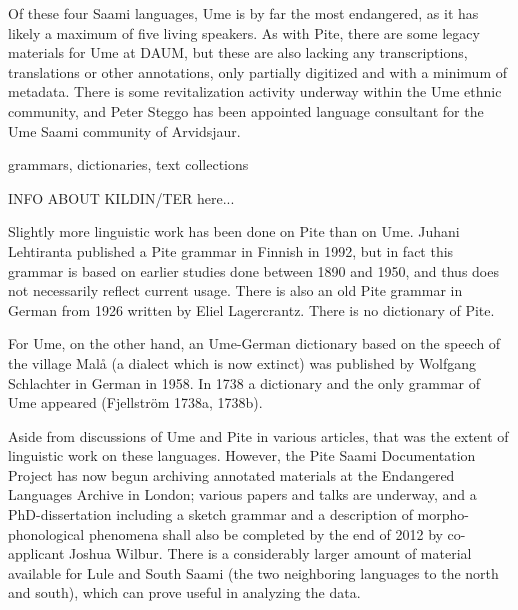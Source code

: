 \documentclass[a4paper,12pt]{article}
\begin{document}
Of these four Saami languages, Ume is by far the most endangered, as it has likely a maximum of five living speakers. As with Pite, there are some legacy materials for Ume at DAUM, but these are also lacking any transcriptions, translations or other annotations, only partially digitized and with a minimum of metadata. There is some revitalization activity underway within the Ume ethnic community, and Peter Steggo has been appointed language consultant for the Ume Saami community of Arvidsjaur. %


grammars, dictionaries, text collections

INFO ABOUT KILDIN/TER here...

Slightly more linguistic work has been done on Pite than on Ume. Juhani Lehtiranta published a Pite grammar in Finnish in 1992, but in fact this grammar is based on earlier studies done between 1890 and 1950, and thus does not necessarily reflect current usage. There is also an old Pite grammar in German from 1926 written by Eliel Lagercrantz. There is no dictionary of Pite.

For Ume, on the other hand, an Ume-German dictionary based on the speech of the village Malå (a dialect which is now extinct) was published by Wolfgang Schlachter in German in 1958. In 1738 a dictionary and the only grammar of Ume appeared (Fjellström 1738a, 1738b). 

Aside from discussions of Ume and Pite in various articles, that was the extent of linguistic work on these languages. However, the Pite Saami Documentation Project has now begun archiving annotated materials at the Endangered Languages Archive in London; %
various papers and talks are underway, %
and a PhD-dissertation including a sketch grammar and a description of morpho-phonological phenomena shall also be completed by the end of 2012 by co-applicant Joshua Wilbur. There is a considerably larger amount of material available for Lule and South Saami (the two neighboring languages to the north and south), which can prove useful in analyzing the data.

\end{document}
